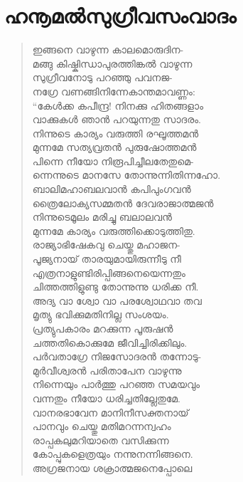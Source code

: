 
\section{ഹനൂമല്‍സുഗ്രീവസംവാദം}

\begin{verse}
ഇങ്ങനെ വാഴുന്ന കാലമൊരുദിന-\\
മങ്ങു കിഷ്കിന്ധാപുരത്തിങ്കല്‍ വാഴുന്ന\\
സുഗ്രീവനോടു പറഞ്ഞു പവനജ-\\
നഗ്രേ വണങ്ങിനിന്നേകാന്തമാവണ്ണം:\\
“കേള്‍ക്ക കപീന്ദ്ര! നിനക്കു ഹിതങ്ങളാം\\
വാക്കുകള്‍ ഞാന്‍ പറയുന്നതു സാദരം.\\
നിന്നുടെ കാര്യം വരുത്തി രഘൂത്തമന്‍\\
മുന്നമേ സത്യവ്രതന്‍ പുരുഷോത്തമന്‍\\
പിന്നെ നീയോ നിരൂപിച്ചീലതേതുമെ-\\
ന്നെന്നുടെ മാനസേ തോന്നുന്നിതിന്നഹോ.\\
ബാലിമഹാബലവാന്‍ കപിപുംഗവന്‍\\
ത്രൈലോക്യസമ്മതന്‍ ദേവരാജാത്മജന്‍\\
നിന്നുടെമൂലം മരിച്ചു ബലാലവന്‍\\
മുന്നമേ കാര്യം വരുത്തിക്കൊടുത്തിതു.\\
രാജ്യാഭിഷേകവു ചെയ്തു മഹാജന-\\
പൂജ്യനായ് താരയുമായിരുന്നീടു നീ\\
എത്രനാളുണ്ടിരിപ്പിങ്ങനെയെന്നതും\\
ചിത്തത്തിളുണ്ടു തോന്നുന്നു ധരിക്ക നീ.\\
അദ്യ വാ ശ്വോ വാ പരശ്വോഥവാ തവ\\
മൃത്യു ഭവിക്കുമതിനില്ല സംശയം.\\
പ്രത്യുപകാരം മറക്കുന്ന പൂരുഷന്‍\\
ചത്തതികൊക്കുമേ ജീവിച്ചിരിക്കിലും.\\
പര്‍വതാഗ്രേ നിജസോദരന്‍ തന്നോടു-\\
മുര്‍വീശ്വരന്‍ പരിതാപേന വാഴുന്നു\\
നിന്നെയും പാര്‍ത്തു പറഞ്ഞ സമയവും\\
വന്നതും നീയോ ധരിച്ചതില്ലേതുമേ.\\
വാനരഭാവേന മാനിനീസക്തനായ്\\
പാനവും ചെയ്തു മതിമറന്നന്വഹം\\
രാപ്പകലുമറിയാതെ വസിക്കുന്ന\\
കോപ്പുകളെത്രയും നന്നുനന്നിങ്ങനെ.\\
അഗ്രജനായ ശക്രാത്മജനെപ്പോലെ\\

\end{verse}
